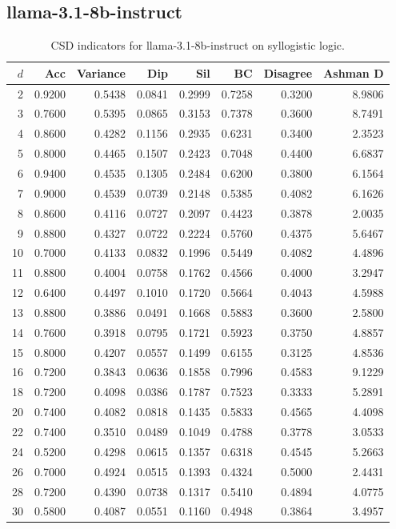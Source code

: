 \documentclass[11pt]{article}
\begin{document}
\subsection{llama-3.1-8b-instruct}

\begin{table}[h]\centering\scriptsize
\caption{CSD indicators for llama-3.1-8b-instruct on syllogistic logic.}
\begin{tabular}{r|r|r|r|r|r|r|r}
\toprule
$d$ & Acc & Variance & Dip & Sil & BC & Disagree & Ashman D \\
\midrule
2 & 0.9200 & 0.5438 & 0.0841 & 0.2999 & 0.7258 & 0.3200 & 8.9806 \\
3 & 0.7600 & 0.5395 & 0.0865 & 0.3153 & 0.7378 & 0.3600 & 8.7491 \\
4 & 0.8600 & 0.4282 & 0.1156 & 0.2935 & 0.6231 & 0.3400 & 2.3523 \\
5 & 0.8000 & 0.4465 & 0.1507 & 0.2423 & 0.7048 & 0.4400 & 6.6837 \\
6 & 0.9400 & 0.4535 & 0.1305 & 0.2484 & 0.6200 & 0.3800 & 6.1564 \\
7 & 0.9000 & 0.4539 & 0.0739 & 0.2148 & 0.5385 & 0.4082 & 6.1626 \\
8 & 0.8600 & 0.4116 & 0.0727 & 0.2097 & 0.4423 & 0.3878 & 2.0035 \\
9 & 0.8800 & 0.4327 & 0.0722 & 0.2224 & 0.5760 & 0.4375 & 5.6467 \\
10 & 0.7000 & 0.4133 & 0.0832 & 0.1996 & 0.5449 & 0.4082 & 4.4896 \\
11 & 0.8800 & 0.4004 & 0.0758 & 0.1762 & 0.4566 & 0.4000 & 3.2947 \\
12 & 0.6400 & 0.4497 & 0.1010 & 0.1720 & 0.5664 & 0.4043 & 4.5988 \\
13 & 0.8800 & 0.3886 & 0.0491 & 0.1668 & 0.5883 & 0.3600 & 2.5800 \\
14 & 0.7600 & 0.3918 & 0.0795 & 0.1721 & 0.5923 & 0.3750 & 4.8857 \\
15 & 0.8000 & 0.4207 & 0.0557 & 0.1499 & 0.6155 & 0.3125 & 4.8536 \\
16 & 0.7200 & 0.3843 & 0.0636 & 0.1858 & 0.7996 & 0.4583 & 9.1229 \\
18 & 0.7200 & 0.4098 & 0.0386 & 0.1787 & 0.7523 & 0.3333 & 5.2891 \\
20 & 0.7400 & 0.4082 & 0.0818 & 0.1435 & 0.5833 & 0.4565 & 4.4098 \\
22 & 0.7400 & 0.3510 & 0.0489 & 0.1049 & 0.4788 & 0.3778 & 3.0533 \\
24 & 0.5200 & 0.4298 & 0.0615 & 0.1357 & 0.6318 & 0.4545 & 5.2663 \\
26 & 0.7000 & 0.4924 & 0.0515 & 0.1393 & 0.4324 & 0.5000 & 2.4431 \\
28 & 0.7200 & 0.4390 & 0.0738 & 0.1317 & 0.5410 & 0.4894 & 4.0775 \\
30 & 0.5800 & 0.4087 & 0.0551 & 0.1160 & 0.4948 & 0.3864 & 3.4957 \\
\bottomrule
\end{tabular}
\end{table}
\end{document}
